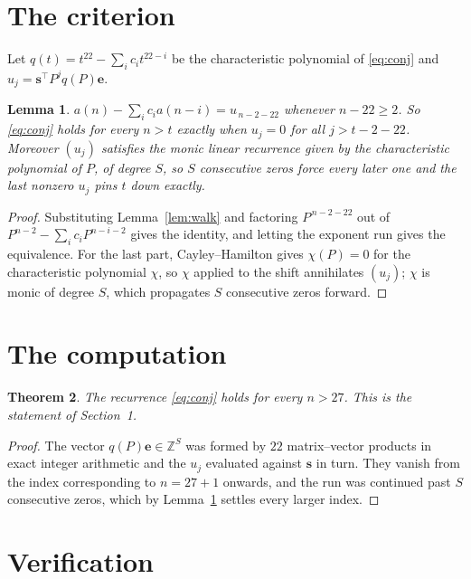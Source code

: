 \documentclass[11pt,a4paper]{article}
\theoremstyle{plain}
\newtheorem{theorem}{Theorem}
\newtheorem{lemma}[theorem]{Lemma}
\theoremstyle{definition}
\begin{document}
\section{The criterion}

Let $q(t)=t^{22}-\sum_i c_i t^{22-i}$ be the characteristic polynomial of
\eqref{eq:conj} and $u_j=\mathbf{s}^{\!\top}P^{j}q(P)\mathbf{e}$.

\begin{lemma}\label{lem:crit}
$a(n)-\sum_i c_i a(n-i)=u_{\,n-2-22}$ whenever $n-22\ge2$. So \eqref{eq:conj}
holds for every $n>t$ exactly when $u_j=0$ for all $j>t-2-22$. Moreover $(u_j)$
satisfies the monic linear recurrence given by the characteristic polynomial of $P$, of
degree $S$, so $S$ consecutive zeros force every later one and the last nonzero $u_j$ pins
$t$ down exactly.
\end{lemma}

\begin{proof}
Substituting Lemma~\ref{lem:walk} and factoring $P^{\,n-2-22}$ out of
$P^{n-2}-\sum_i c_i P^{n-i-2}$ gives the identity, and letting the exponent run gives the
equivalence. For the last part, Cayley--Hamilton gives $\chi(P)=0$ for the characteristic
polynomial $\chi$, so $\chi$ applied to the shift annihilates $(u_j)$; $\chi$ is monic of
degree $S$, which propagates $S$ consecutive zeros forward.
\end{proof}

\section{The computation}

\begin{theorem}
The recurrence \eqref{eq:conj} holds for every $n>27$. This is the statement of
Section~1.
\end{theorem}

\begin{proof}
The vector $q(P)\mathbf{e}\in\mathbb{Z}^{S}$ was formed by $22$ matrix--vector
products in exact integer arithmetic and the $u_j$ evaluated against $\mathbf{s}$ in turn.
They vanish from the index corresponding to $n=27+1$ onwards, and the run was continued
past $S$ consecutive zeros, which by Lemma~\ref{lem:crit} settles every larger index.
\end{proof}

\section{Verification}
\end{document}
